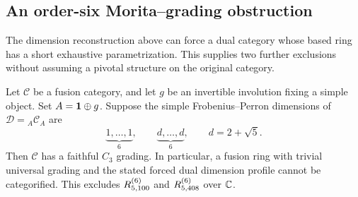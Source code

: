 \subsection{An order-six Morita--grading obstruction}
\label{sec:morita-order6}

The dimension reconstruction above can force a dual category whose
based ring has a short exhaustive parametrization. This supplies two
further exclusions without assuming a pivotal structure on the original
category.

\begin{theorem}\label{thm:morita-order6}
Let $\mathcal C$ be a fusion category, and let $g$ be an invertible
involution fixing a simple object. Set $A=\mathbf1\oplus g$. Suppose the
simple Frobenius--Perron dimensions of
$\mathcal D={}_A\mathcal C_A$ are
\[
  \underbrace{1,\ldots,1}_{6},\qquad
  \underbrace{d,\ldots,d}_{6},\qquad d=2+\sqrt5.
\]
Then $\mathcal C$ has a faithful $C_3$ grading. In particular, a fusion
ring with trivial universal grading and the stated forced dual dimension
profile cannot be categorified. This excludes
$R^{(6)}_{5,100}$ and $R^{(6)}_{5,408}$ over $\mathbb C$.
\end{theorem}

